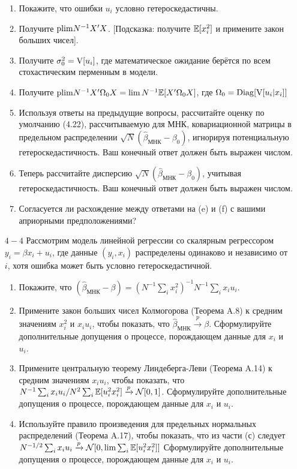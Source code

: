 \begin{small}
\begin{enumerate}
\begin{enumerate}
\item Покажите, что ошибки $u_i$ условно гетероскедастичны.
\item Получите $\mathrm{plim } N^{-1}X'X$. [Подсказка: получите $\mathbb{E}[x_i^2]$ и примените закон больших чисел].
\item Получите $\sigma_0^2 = \mathrm{V}[u_i]$, где математическое ожидание берётся по всем стохастическим перменным в модели.
\item Получите $\mathrm{plim } N^{-1}X'\Omega_0 X = \lim N^{-1}\mathbb{E}[X'\Omega_0 X]$, где $\Omega_0 = \mathrm{Diag}[\mathrm{V}[u_i|x_i]]$
\item Используя ответы на предыдущие вопросы, рассчитайте оценку по умолчанию (4.22), рассчитываемую для МНК, ковариационной матрицы в предельном распределении $\sqrt{N}(\hat{\beta}_{\text{МНК}}-\beta_0)$, игнорируя потенциальную гетероскедастичность. Ваш конечный ответ должен быть выражен числом. 
\item Теперь рассчитайте дисперсию  $\sqrt{N}(\hat{\beta}_{\text{МНК}}-\beta_0)$, учитывая гетероскедастичность. Ваш конечный ответ должен быть выражен числом.
\item Согласуется ли расхождение между ответами на (e) и (f) с вашими априорными предположениями?
\end{enumerate}
\item [$4-4$] Рассмотрим модель линейной регрессии со скалярным регрессором $y_i=\beta x_i +u_i$, где данные $(y_i, x_i)$ распределены одинаково и независимо от $i$, хотя ошибка может быть условно гетероскедастичной.
\begin{enumerate}
\item Покажите, что $(\hat{\beta}_{\text{МНК}}-\beta) = (N^{-1}\sum_i x_i^2)^{-1}N^{-1}\sum_i x_i u_i$.
\item Примените закон больших чисел Колмогорова (Теорема A.8) к средним значениям $x_i^2$ и $x_i u_i$, чтобы показать, что $\hat{\beta}_{\text{МНК}} \xrightarrow{p} \beta$. Сформулируйте дополнительные допущения о процессе, порождающем данные для $x_i$ и $u_i$.
\item Примените центральную теорему Линдеберга-Леви (Теорема A.14) к средним значениям $x_i u_i$, чтобы показать, что $N^{-1}\sum_i x_i u_i /N^2 \sum_i \mathbb{E} [u_i^2 x_i^2] \xrightarrow{p} \mathcal{N}[0,1]$. Сформулируйте дополнительные допущения о процессе, порождающем данные для $x_i$ и $u_i$.
\item Используйте правило произведения для предельных нормальных распределений (Теорема A.17), чтобы показать, что из части (с) следует $N^{-1/2}\sum_i x_i u_i \xrightarrow{p} \mathcal{N}[0,\lim  \sum_i \mathbb{E} [u_i^2 x_i^2]]$ Сформулируйте дополнительные допущения о процессе, порождающем данные для $x_i$ и $u_i$.

\end{enumerate}
\end{enumerate}
\end{small}
